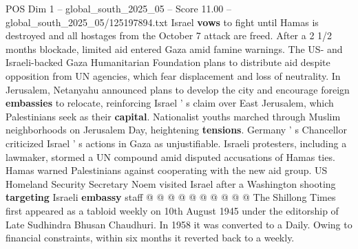 \begin{textsample}{POS Dim 1 – global\_south\_2025\_05 – Score 11.00 – global\_south\_2025\_05/125197894.txt}
Israel \textbf{vows} to fight until Hamas is destroyed and all hostages from the October 7 attack are freed.
After a 2 1/2 months blockade, limited aid entered Gaza amid famine warnings.
The US- and Israeli-backed Gaza Humanitarian Foundation plans to distribute aid despite opposition from UN agencies, which fear displacement and loss of neutrality.
In Jerusalem, Netanyahu announced plans to develop the city and encourage foreign \textbf{embassies} to relocate, reinforcing Israel ' s claim over East Jerusalem, which Palestinians seek as their \textbf{capital}.
Nationalist youths marched through Muslim neighborhoods on Jerusalem Day, heightening \textbf{tensions}.
Germany ' s Chancellor criticized Israel ' s actions in Gaza as unjustifiable.
Israeli protesters, including a lawmaker, stormed a UN compound amid disputed accusations of Hamas ties.
Hamas warned Palestinians against cooperating with the new aid group.
US Homeland Security Secretary Noem visited Israel after a Washington shooting \textbf{targeting} Israeli \textbf{embassy} staff @ @ @ @ @ @ @ @ @ @ The Shillong Times first appeared as a tabloid weekly on 10th August 1945 under the editorship of Late Sudhindra Bhusan Chaudhuri.
In 1958 it was converted to a Daily.
Owing to financial constraints, within six months it reverted back to a weekly.

\end{textsample}
